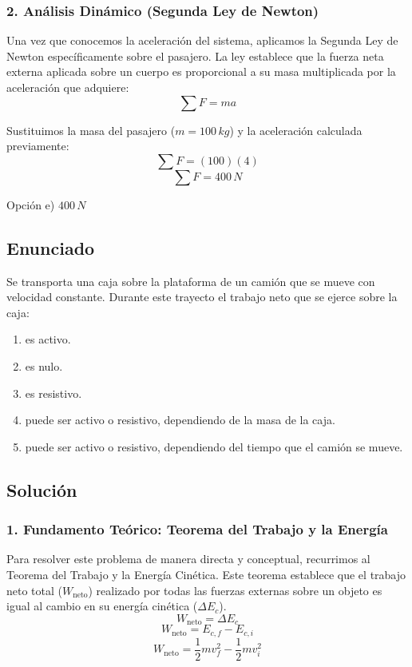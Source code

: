 \documentclass[12pt, a4paper]{article}
\begin{document}
\subsubsection*{2. Análisis Dinámico (Segunda Ley de Newton)}
Una vez que conocemos la aceleración del sistema, aplicamos la Segunda Ley de Newton específicamente sobre el pasajero. La ley establece que la fuerza neta externa aplicada sobre un cuerpo es proporcional a su masa multiplicada por la aceleración que adquiere:
$$ \sum F = m a $$

Sustituimos la masa del pasajero ($m = 100 \, \si{kg}$) y la aceleración calculada previamente:
$$ \sum F = (100) (4) $$
$$ \sum F = 400 \, \si{N} $$

\begin{tcolorbox}[colback=green!5!white, colframe=green!50!black, title=Respuesta Final]
\centering Opción e) $400 \, \si{N}$
\end{tcolorbox}

\newpage

\subsection*{Enunciado}
Se transporta una caja sobre la plataforma de un camión que se mueve con velocidad constante. Durante este trayecto el trabajo neto que se ejerce sobre la caja:
\begin{enumerate}[label=\alph*)]
    \item es activo.
    \item es nulo.
    \item es resistivo.
    \item puede ser activo o resistivo, dependiendo de la masa de la caja.
    \item puede ser activo o resistivo, dependiendo del tiempo que el camión se mueve.
\end{enumerate}

\subsection*{Solución}

\subsubsection*{1. Fundamento Teórico: Teorema del Trabajo y la Energía}
Para resolver este problema de manera directa y conceptual, recurrimos al Teorema del Trabajo y la Energía Cinética. Este teorema establece que el trabajo neto total ($W_{\text{neto}}$) realizado por todas las fuerzas externas sobre un objeto es igual al cambio en su energía cinética ($\Delta E_c$).
$$ W_{\text{neto}} = \Delta E_c $$
$$ W_{\text{neto}} = E_{c,f} - E_{c,i} $$
$$ W_{\text{neto}} = \frac{1}{2} m v_f^2 - \frac{1}{2} m v_i^2 $$
\end{document}
